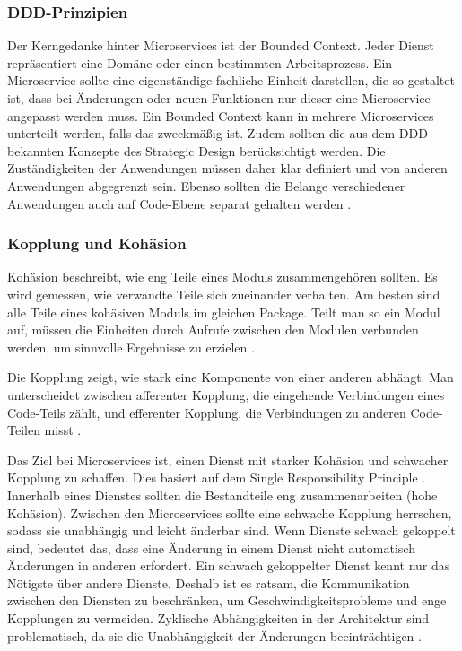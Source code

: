 {\subsubsection{DDD-Prinzipien}

Der Kerngedanke hinter Microservices ist der Bounded Context. Jeder Dienst repräsentiert eine Domäne oder einen bestimmten Arbeitsprozess. Ein Microservice sollte eine eigenständige fachliche Einheit darstellen, die so gestaltet ist, dass bei Änderungen oder neuen Funktionen nur dieser eine Microservice angepasst werden muss. Ein Bounded Context kann in mehrere Microservices unterteilt werden, falls das zweckmäßig ist. Zudem sollten die aus dem DDD bekannten Konzepte des Strategic Design berücksichtigt werden. Die Zuständigkeiten der Anwendungen müssen daher klar definiert und von anderen Anwendungen abgegrenzt sein. Ebenso sollten die Belange verschiedener Anwendungen auch auf Code-Ebene separat gehalten werden \cite[S.253,254]{richards} \cite[S. 48-51]{wolff} \cite[S.289]{daschner}.

\subsubsection{Kopplung und Kohäsion}

Kohäsion beschreibt, wie eng Teile eines Moduls zusammengehören sollten. Es wird gemessen, wie verwandte Teile sich zueinander verhalten. Am besten sind alle Teile eines kohäsiven Moduls im gleichen Package. Teilt man so ein Modul auf, müssen die Einheiten durch Aufrufe zwischen den Modulen verbunden werden, um sinnvolle Ergebnisse zu erzielen \cite[S.40]{richards}.

Die Kopplung zeigt, wie stark eine Komponente von einer anderen abhängt. Man unterscheidet zwischen afferenter Kopplung, die eingehende Verbindungen eines Code-Teils zählt, und efferenter Kopplung, die Verbindungen zu anderen Code-Teilen misst \cite[S.44]{richards}.

Das Ziel bei Microservices ist, einen Dienst mit starker Kohäsion und schwacher Kopplung zu schaffen. Dies basiert auf dem \glqq Single Responsibility Principle\grqq{} \cite[S.154-157]{sommerville}. Innerhalb eines Dienstes sollten die Bestandteile eng zusammenarbeiten (hohe Kohäsion). Zwischen den Microservices sollte eine schwache Kopplung herrschen, sodass sie unabhängig und leicht änderbar sind. Wenn Dienste schwach gekoppelt sind, bedeutet das, dass eine Änderung in einem Dienst nicht automatisch Änderungen in anderen erfordert. Ein schwach gekoppelter Dienst kennt nur das Nötigste über andere Dienste. Deshalb ist es ratsam, die Kommunikation zwischen den Diensten zu beschränken, um Geschwindigkeitsprobleme und enge Kopplungen zu vermeiden. Zyklische Abhängigkeiten in der Architektur sind problematisch, da sie die Unabhängigkeit der Änderungen beeinträchtigen \cite[S. 101-105]{wolff} \cite[S.56]{newman}.

}
